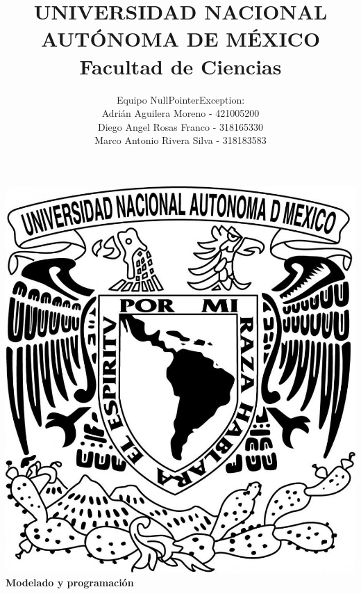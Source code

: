 \title{UNIVERSIDAD NACIONAL AUT\'ONOMA DE M\'EXICO\\ Facultad de Ciencias}
\author{Equipo NullPointerException:\\
        Adri\'an Aguilera Moreno   - 421005200\\
        Diego Angel Rosas Franco   - 318165330 \\
        Marco Antonio Rivera Silva - 318183583}
\date{}
\maketitle
\begin{center}
  \includegraphics[scale=0.20]{../Portada/Portada}\\[0.4cm]
  \Large
  \bf{Modelado y programación}
  \normalsize
\end{center}
\newpage
{}

